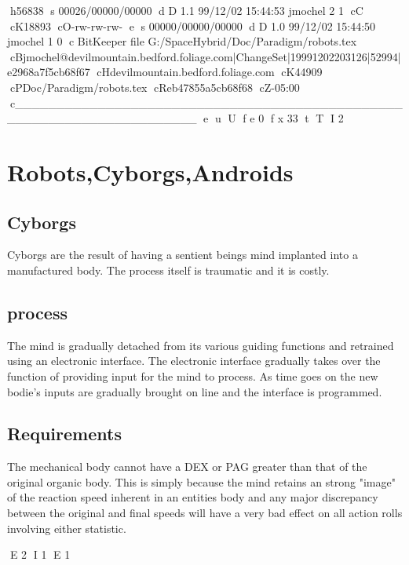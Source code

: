 h56838
s 00026/00000/00000
d D 1.1 99/12/02 15:44:53 jmochel 2 1
cC
cK18893
cO-rw-rw-rw-
e
s 00000/00000/00000
d D 1.0 99/12/02 15:44:50 jmochel 1 0
c BitKeeper file G:/SpaceHybrid/Doc/Paradigm/robots.tex
cBjmochel@devilmountain.bedford.foliage.com|ChangeSet|19991202203126|52994|e2968a7f5cb68f67
cHdevilmountain.bedford.foliage.com
cK44909
cPDoc/Paradigm/robots.tex
cReb47855a5cb68f68
cZ-05:00
c______________________________________________________________________
e
u
U
f e 0
f x 33
t
T
I 2
\chapter{Robots,Cyborgs,Androids}

\section{Cyborgs}

Cyborgs are the result of having a sentient beings mind implanted 
into a manufactured body. The process itself is traumatic and it is 
costly. 

\section{process}

The mind is gradually detached from its various guiding functions and 
retrained using an electronic interface. The electronic interface 
gradually takes over the function of providing input for the mind to 
process. As time goes on the new bodie's inputs are gradually brought 
on line and the interface is programmed. 

\section{Requirements }

The mechanical body cannot have a DEX or PAG greater than that of the 
original organic body. This is simply because the mind retains an 
strong "image" of the reaction speed inherent in an entities body and 
any major discrepancy between the original and final speeds will have 
a very bad effect on all action rolls involving either statistic. 



E 2
I 1
E 1
